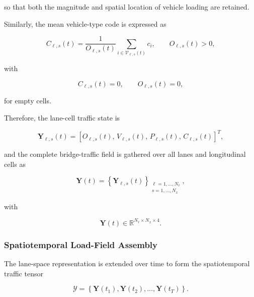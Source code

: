 \documentclass[journal]{IEEEtran}
\newcommand{\mathbfcal}[1]{\boldsymbol{\mathcal{#1}}}
\begin{document}
so that both the magnitude and spatial location of vehicle loading are retained.

Similarly, the mean vehicle-type code is expressed as

\begin{equation}
C_{\ell,s}(t)
=
\frac{1}{O_{\ell,s}(t)}
\sum_{i\in\mathcal{V}_{\ell,s}(t)}
c_i,
\qquad
O_{\ell,s}(t)>0,
\label{eq:mean_vehicle_type}
\end{equation}

with

\begin{equation}
C_{\ell,s}(t)=0,
\qquad
O_{\ell,s}(t)=0,
\label{eq:empty_vehicle_type}
\end{equation}

for empty cells.

Therefore, the lane-cell traffic state is

\begin{equation}
\mathbf{Y}_{\ell,s}(t)
=
\left[
O_{\ell,s}(t),\,
V_{\ell,s}(t),\,
P_{\ell,s}(t),\,
C_{\ell,s}(t)
\right]^{T},
\label{eq:lane_cell_state}
\end{equation}

and the complete bridge-traffic field is gathered over all lanes and longitudinal cells as

\begin{equation}
\mathbf{Y}(t)
=
\left\{
\mathbf{Y}_{\ell,s}(t)
\right\}_{
\substack{
\ell=1,\ldots,N_{\ell}\\
s=1,\ldots,N_x
}},
\label{eq:traffic_field}
\end{equation}

with

\begin{equation}
\mathbf{Y}(t)
\in
\mathbb{R}^{N_{\ell}\times N_x\times 4}.
\label{eq:traffic_field_dimension}
\end{equation}


\subsubsection{Spatiotemporal Load-Field Assembly}
\label{subsec:spatiotemporal_field}

The lane-space representation is extended over time to form the spatiotemporal traffic tensor

\begin{equation}
\mathbfcal{Y}
=
\left\{
\mathbf{Y}(t_1),
\mathbf{Y}(t_2),
\ldots,
\mathbf{Y}(t_T)
\right\}.
\label{eq:spatiotemporal_tensor}
\end{equation}
\end{document}
